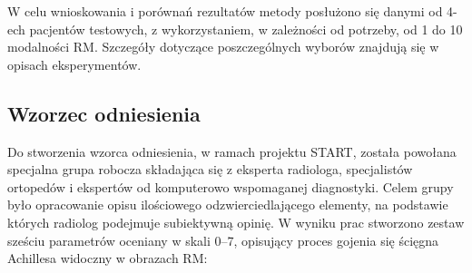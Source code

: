 W celu wnioskowania i porównań rezultatów metody posłużono się danymi \linebreak od 4-ech pacjentów testowych, z wykorzystaniem, w zależności od potrzeby, od 1 do 10 modalności RM. Szczegóły dotyczące poszczególnych wyborów znajdują się \linebreak w opisach eksperymentów.


\subsection{Wzorzec odniesienia}
\label{seq:ground-truth}
Do stworzenia wzorca odniesienia, w ramach projektu START, została powołana specjalna grupa robocza składająca się z eksperta radiologa, specjalistów ortopedów i ekspertów od komputerowo wspomaganej diagnostyki. Celem grupy było opracowanie opisu ilościowego odzwierciedlającego elementy, na podstawie których radiolog podejmuje subiektywną opinię. W wyniku prac stworzono zestaw sześciu parametrów oceniany w skali 0--7, opisujący proces gojenia się ścięgna Achillesa widoczny w obrazach RM:

